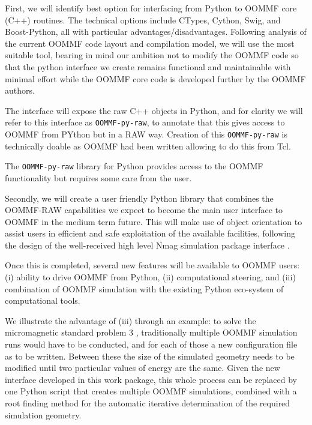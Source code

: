 \begin{workpackage}
\begin{tasklist}


\begin{task}[id=oommf-python-interface,title=OOMMF case study: Create Python interface to OOMMF code]

  First, we will identify best option for interfacing from Python to OOMMF
  core (C++) routines. The technical options include CTypes, Cython, Swig,
  and Boost-Python, all with particular
  advantages/disadvantages. Following analysis of the current OOMMF
  code layout and compilation model, we will use the most suitable
  tool, bearing in mind our ambition not to modify the OOMMF code so
  that the python interface we create remains functional and
  maintainable with minimal effort while the OOMMF core code is
  developed further by the OOMMF authors.

  The interface will expose the raw C++ objects in Python, and for
  clarity we will refer to this interface as \texttt{OOMMF-py-raw}, to
  annotate that this gives access to OOMMF from PYthon but in a RAW
  way. Creation of this \texttt{OOMMF-py-raw} is technically doable as
  OOMMF had been written allowing to do this from Tcl.

  The \texttt{OOMMF-py-raw} library for Python
  provides access to the OOMMF functionality but requires some care
  from the user. 

  Secondly, we will create a user friendly Python library that
  combines the OOMMF-RAW capabilities we expect to become the main
  user interface to OOMMF in the medium term future. This will make
  use of object orientation to assist users in efficient and safe
  exploitation of the available facilities, following the design of
  the well-received high level Nmag simulation package
  \cite{Fischbacher2007a} interface \cite{Nmag-url}.

  Once this is completed, several new features will be available to
  OOMMF users: (i) ability to drive OOMMF from Python, (ii)
  computational steering, and (iii) combination of OOMMF simulation
  with the existing Python eco-system of computational tools.


  We illustrate the advantage of (iii) through an example: to solve
  the micromagnetic standard problem 3
  \cite{Micromagnetic-Standardproblem-3}, traditionally multiple OOMMF
  simulation runs would have to be conducted, and for each of those a
  new configuration file as to be written. Between these the size of
  the simulated geometry needs to be modified until two particular
  values of energy are the same. Given the new interface developed in
  this work package, this whole process can be replaced by one Python
  script that creates multiple OOMMF simulations, combined with a root
  finding method for the automatic iterative determination of the
  required simulation geometry.


\end{task}
\end{tasklist}
\end{workpackage}
